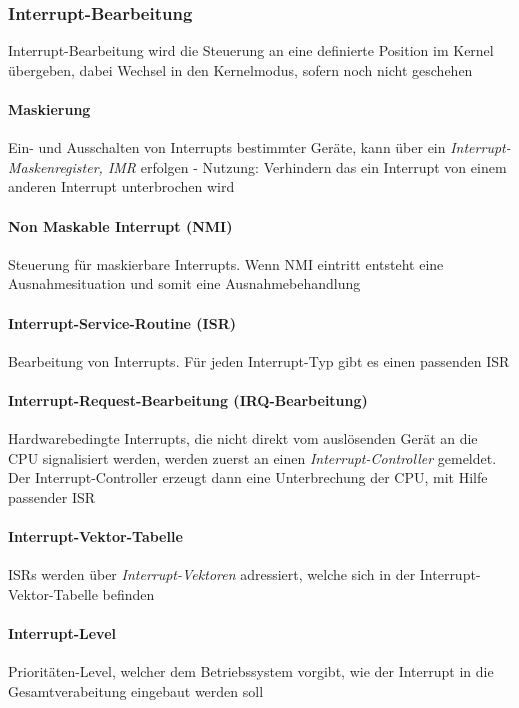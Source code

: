 \documentclass[10pt,a4paper,landscape]{article}
\begin{document}
\begin{multicols*}{3}
	\subsubsection{Interrupt-Bearbeitung}
	Interrupt-Bearbeitung wird die Steuerung an eine definierte Position im Kernel übergeben, dabei Wechsel in den Kernelmodus, sofern noch nicht geschehen
	\paragraph{Maskierung} Ein- und Ausschalten von Interrupts bestimmter Geräte, kann über ein \textit{Interrupt-Maskenregister, IMR} erfolgen - Nutzung: Verhindern das ein Interrupt von einem anderen Interrupt unterbrochen wird
	\paragraph{Non Maskable Interrupt (NMI)} Steuerung für maskierbare Interrupts. Wenn NMI eintritt entsteht eine Ausnahmesituation und somit eine Ausnahmebehandlung
	\paragraph{Interrupt-Service-Routine (ISR)} Bearbeitung von Interrupts. Für jeden Interrupt-Typ gibt es einen passenden ISR
	\paragraph{Interrupt-Request-Bearbeitung (IRQ-Bearbeitung)} Hardwarebedingte Interrupts, die nicht direkt vom auslösenden Gerät an die CPU signalisiert werden, werden zuerst an einen \textit{Interrupt-Controller} gemeldet. Der Interrupt-Controller erzeugt dann eine Unterbrechung der CPU, mit Hilfe passender ISR
	\paragraph{Interrupt-Vektor-Tabelle} ISRs werden über \textit{Interrupt-Vektoren} adressiert, welche sich in der Interrupt-Vektor-Tabelle befinden
	\paragraph{Interrupt-Level} Prioritäten-Level, welcher dem Betriebssystem vorgibt, wie der Interrupt in die Gesamtverabeitung eingebaut werden soll

\end{multicols*}
\end{document}
